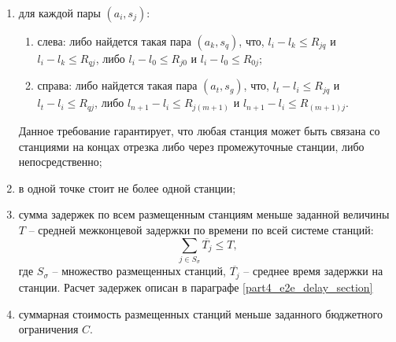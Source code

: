 \begin{enumerate}
    \item  для каждой пары $(a_i,s_j)$:
        \begin{enumerate}
            \item слева: либо найдется такая пара $(a_k,s_q)$, что, $l_i - l_k \leqslant R_{jq}$  и $l_i - l_k  \leqslant R_{qj}$, либо $l_i-l_0 \leqslant R_{j0}$ и $l_i - l_0 \leqslant R_{0j}$;
            \item справа: либо найдется такая пара $(a_t,s_g)$, что, $l_t-l_i \leqslant R_{jq}$ и $l_t - l_i \leqslant R_{qj}$, либо $l_{n+1}-l_i \leqslant R_{j(m+1)}$ и $l_{n+1}-l_i \leqslant R_{(m+1)j}$. 
  \end{enumerate}
Данное требование гарантирует, что любая станция может быть связана со станциями на концах отрезка либо через промежуточные станции, либо непосредственно;
    \item в одной точке стоит не более одной станции;
    \item сумма задержек по всем размещенным станциям меньше заданной величины $T$ – средней межконцевой задержки по времени по всей системе станций:
    \begin{displaymath}
        \label{eq:part3_e2e_delay}
        \sum\limits_{j \in S_\sigma} \overline{T_j} \leqslant T,
    \end{displaymath}
где $S_\sigma$ – множество размещенных станций, $\overline{T_j}$ -- среднее время задержки на станции. Расчет задержек описан в параграфе \cref{part4_e2e_delay_section}
    \item суммарная стоимость размещенных станций меньше заданного бюджетного ограничения  $C$.
\end{enumerate}

